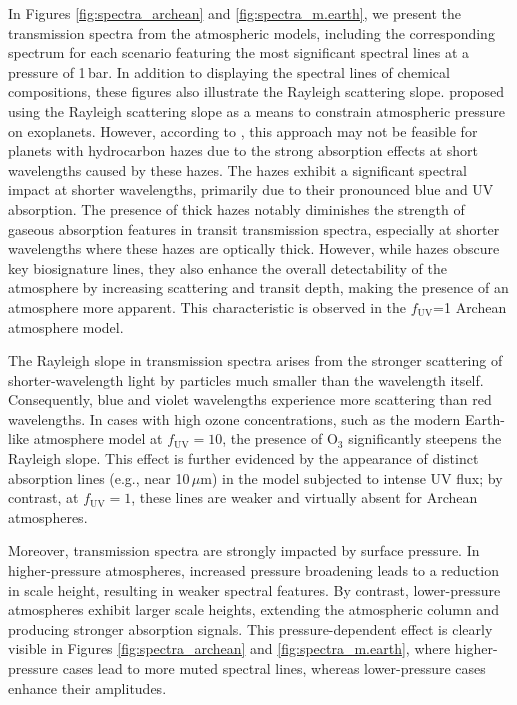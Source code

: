 In Figures \ref{fig:spectra_archean} and \ref{fig:spectra_m.earth}, we present the transmission spectra from the atmospheric models, including the corresponding spectrum for each scenario featuring the most significant spectral lines at a pressure of 1\,bar. In addition to displaying the spectral lines of chemical compositions, these figures also illustrate the Rayleigh scattering slope. 
\cite{Benneke.and.Seager.2012ApJ...753..100B} proposed using the Rayleigh scattering slope as a means to constrain atmospheric pressure on exoplanets. However, according to \cite{Arney.et.al.2016AsBio..16..873A}, this approach may not be feasible for planets with hydrocarbon hazes due to the strong absorption effects at short wavelengths caused by these hazes. The hazes exhibit a significant spectral impact at shorter wavelengths, primarily due to their pronounced blue and UV absorption. The presence of thick hazes notably diminishes the strength of gaseous absorption features in transit transmission spectra, especially at shorter wavelengths where these hazes are optically thick. However, while hazes obscure key biosignature lines, they also enhance the overall detectability of the atmosphere by increasing scattering and transit depth, making the presence of an atmosphere more apparent. 
This characteristic is observed in the $f_\mathrm{UV}$=1 Archean atmosphere model. 

The Rayleigh slope in transmission spectra arises from the stronger scattering of shorter-wavelength light by particles much smaller than the wavelength itself. Consequently, blue and violet wavelengths experience more scattering than red wavelengths. In cases with high ozone concentrations, such as the modern Earth-like atmosphere model at $f_\mathrm{UV}=10$, the presence of O$_3$ significantly steepens the Rayleigh slope. This effect is further evidenced by the appearance of distinct absorption lines (e.g., near 10\,$\mu$m) in the model subjected to intense UV flux; by contrast, at $f_\mathrm{UV}=1$, these lines are weaker and virtually absent for Archean atmospheres.

Moreover, transmission spectra are strongly impacted by surface pressure. In higher-pressure atmospheres, increased pressure broadening leads to a reduction in scale height, resulting in weaker spectral features. By contrast, lower-pressure atmospheres exhibit larger scale heights, extending the atmospheric column and producing stronger absorption signals. This pressure-dependent effect is clearly visible in Figures \ref{fig:spectra_archean} and \ref{fig:spectra_m.earth}, where higher-pressure cases lead to more muted spectral lines, whereas lower-pressure cases enhance their amplitudes.

